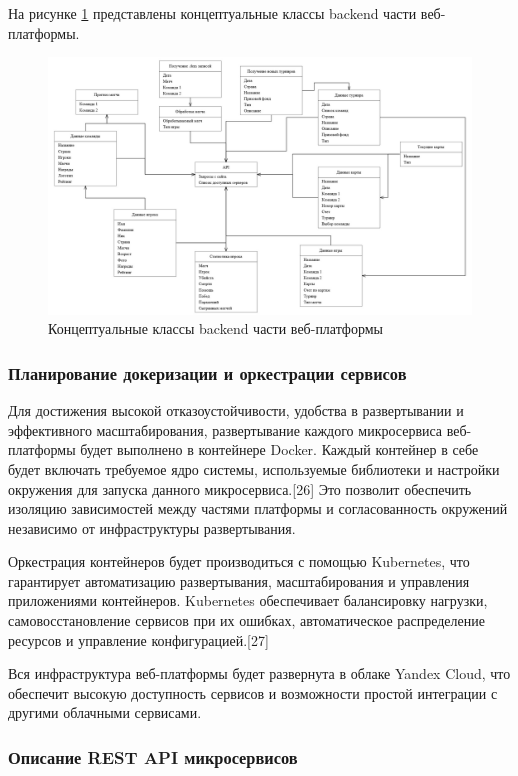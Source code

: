 На рисунке \ref{fig:-conceptual_classes} представлены концептуальные классы backend части веб-платформы.
\begin{figure}
	\centering
	\includegraphics[width=0.9\linewidth]{"images/Концептуальные классы"}
	\caption[Концептуальные классы backend части веб-платформы]{Концептуальные классы backend части веб-платформы}
	\label{fig:-conceptual_classes}
\end{figure}

\subsubsection{Планирование докеризации и оркестрации сервисов}

Для достижения высокой отказоустойчивости, удобства в развертывании и эффективного масштабирования, развертывание каждого микросервиса веб-платформы будет выполнено в контейнере Docker. Каждый контейнер в себе будет включать требуемое ядро системы, используемые библиотеки и настройки окружения для запуска данного микросервиса.[26] Это позволит обеспечить изоляцию зависимостей между частями платформы и согласованность окружений независимо от инфраструктуры развертывания.

Оркестрация контейнеров будет производиться с помощью Kubernetes, что гарантирует автоматизацию развертывания, масштабирования и управления приложениями контейнеров. Kubernetes обеспечивает балансировку нагрузки, самовосстановление сервисов при их ошибках, автоматическое распределение ресурсов и управление конфигурацией.[27]

Вся инфраструктура веб-платформы будет развернута в облаке Yandex Cloud, что обеспечит высокую доступность сервисов и возможности простой интеграции с другими облачными сервисами.

\subsubsection{Описание REST API микросервисов}

